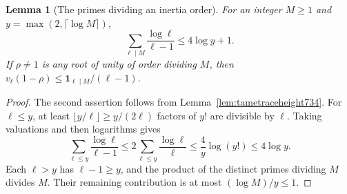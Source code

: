 \documentclass[a4paper,11pt]{article}
\newtheorem{lemma}[proposition]{Lemma}
\theoremstyle{definition}
\theoremstyle{remark}
\numberwithin{equation}{section}
\begin{document}
\begin{lemma}[The primes dividing an inertia order]\leavevmode
\label{lem:orderprimes739}
For an integer \(M\ge1\) and \(y=\max(2,\lceil\log M\rceil)\),
\[
        \sum_{\ell\mid M}\frac{\log\ell}{\ell-1}\le 4\log y+1 .
\]
If \(\rho\ne1\) is any root of unity of order dividing \(M\),
then \(v_\ell(1-\rho)\le\mathbf1_{\ell\mid M}/(\ell-1)\).
\end{lemma}
\begin{proof}
The second assertion follows from Lemma~\ref{lem:tametraceheight734}.
For \(\ell\le y\), at least \(\lfloor y/\ell\rfloor\ge y/(2\ell)\)
factors of \(y!\) are divisible by \(\ell\). Taking valuations and
then logarithms gives
\[
   \sum_{\ell\le y}\frac{\log\ell}{\ell-1}
      \le 2\sum_{\ell\le y}\frac{\log\ell}{\ell}
      \le \frac4y\log(y!)\le 4\log y .
\]
Each \(\ell>y\) has \(\ell-1\ge y\), and the product of the
distinct primes dividing \(M\) divides \(M\). Their remaining
contribution is at most \((\log M)/y\le1\).
\end{proof}
\end{document}
